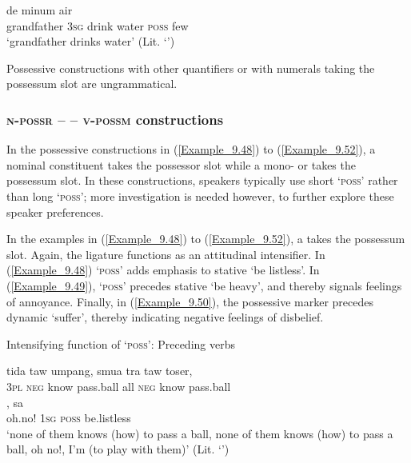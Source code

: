 \ea
\label{Example_9.47}
 {de} {minum} {air} {} {}\\ %
 grandfather  \textsc{3sg}  drink  water  \textsc{poss}  few\\
\glt 
‘grandfather drinks  water’ (Lit. ‘’) \textstyleExampleSource{[Elicited BR111020.007]}
\z



Possessive constructions with other quantifiers or with numerals taking the possessum slot are ungrammatical.


\subsubsection[n{}-possr – punya – v{}-possm constructions]{\textsc{n-possr} –  – \textsc{v-possm} constructions}
\label{Para_9.3.3.2}
In the possessive constructions in (\ref{Example_9.48}) to (\ref{Example_9.52}), a nominal constituent takes the possessor slot while a mono- or   takes the possessum slot. In these constructions, speakers typically use short  ‘\textsc{poss}’ rather than long  ‘\textsc{poss}’; more investigation is needed however, to further explore these speaker preferences.



In the examples in (\ref{Example_9.48}) to (\ref{Example_9.52}), a   takes the possessum slot. Again, the ligature functions as an attitudinal intensifier. In (\ref{Example_9.48})  ‘\textsc{poss}’ adds emphasis to stative  ‘be listless’. In (\ref{Example_9.49}),  ‘\textsc{poss}’ precedes stative  ‘be heavy’, and thereby signals feelings of annoyance. Finally, in (\ref{Example_9.50}), the possessive marker precedes dynamic  ‘suffer’, thereby indicating negative feelings of disbelief.



\begin{styleExampleTitle}
Intensifying function of  ‘\textsc{poss}’: Preceding  verbs
\end{styleExampleTitle}

\ea
\label{Example_9.48}
 {{tida}} {{taw}} {umpang,} {smua} {tra} {taw} {toser,}\\ %
 \textsc{3pl}  {\textsc{neg}}  {know}  pass.ball  all  \textsc{neg}  know  pass.ball\\
,  {sa}    {}\\
 {oh.no!}  {\textsc{1sg}}  \textsc{poss}  {be.listless}\\
 ‘none of them knows (how) to pass a ball, none of them knows (how) to pass a ball, oh no!, I’m  (to play with them)’ (Lit. ‘’) \textstyleExampleSource{[081109-001-Cv.0127]}
\z


